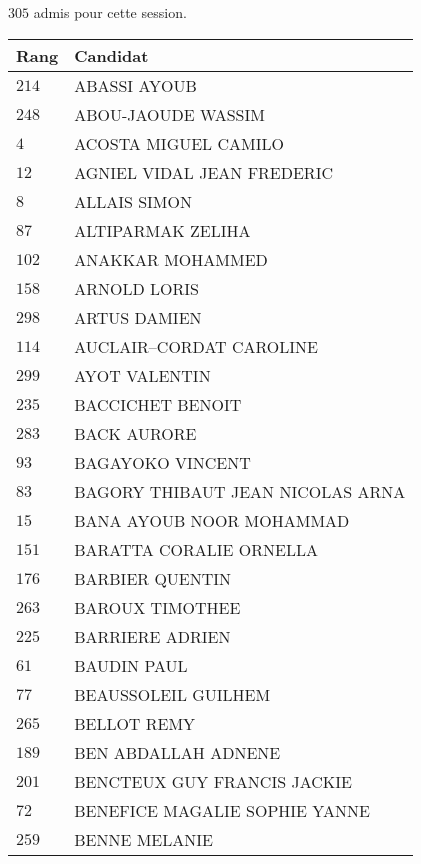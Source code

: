 



  $305$ admis pour cette session.

  \begin{xltabular}{\linewidth}{|l|X|}
    \hline
    \textbf{Rang} & \textbf{Candidat} \\
    \hline
    $214$ & ABASSI AYOUB \\
    \hline
    $248$ & ABOU-JAOUDE WASSIM \\
    \hline
    $4$ & ACOSTA MIGUEL CAMILO \\
    \hline
    $12$ & AGNIEL VIDAL JEAN FREDERIC \\
    \hline
    $8$ & ALLAIS SIMON \\
    \hline
    $87$ & ALTIPARMAK ZELIHA \\
    \hline
    $102$ & ANAKKAR MOHAMMED \\
    \hline
    $158$ & ARNOLD LORIS \\
    \hline
    $298$ & ARTUS DAMIEN \\
    \hline
    $114$ & AUCLAIR--CORDAT CAROLINE \\
    \hline
    $299$ & AYOT VALENTIN \\
    \hline
    $235$ & BACCICHET BENOIT \\
    \hline
    $283$ & BACK AURORE \\
    \hline
    $93$ & BAGAYOKO VINCENT \\
    \hline
    $83$ & BAGORY THIBAUT JEAN NICOLAS ARNA \\
    \hline
    $15$ & BANA AYOUB NOOR MOHAMMAD \\
    \hline
    $151$ & BARATTA CORALIE ORNELLA \\
    \hline
    $176$ & BARBIER QUENTIN \\
    \hline
    $263$ & BAROUX TIMOTHEE \\
    \hline
    $225$ & BARRIERE ADRIEN \\
    \hline
    $61$ & BAUDIN PAUL \\
    \hline
    $77$ & BEAUSSOLEIL GUILHEM \\
    \hline
    $265$ & BELLOT REMY \\
    \hline
    $189$ & BEN ABDALLAH ADNENE \\
    \hline
    $201$ & BENCTEUX GUY FRANCIS JACKIE \\
    \hline
    $72$ & BENEFICE MAGALIE SOPHIE YANNE \\
    \hline
    $259$ & BENNE MELANIE \\

\end{xltabular}

